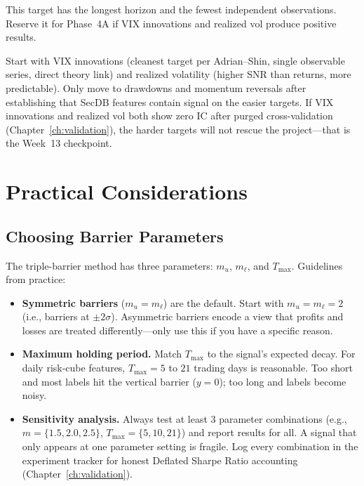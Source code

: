 This target has the longest horizon and the fewest independent
observations.
Reserve it for Phase~4A if VIX innovations and realized vol
produce positive results.

\begin{keyidea}
Start with VIX innovations (cleanest target per Adrian--Shin, single
observable series, direct theory link) and realized volatility
(higher SNR than returns, more predictable).
Only move to drawdowns and momentum reversals after establishing
that SecDB features contain signal on the easier targets.
If VIX innovations and realized vol both show zero IC after purged
cross-validation (Chapter~\ref{ch:validation}), the harder targets
will not rescue the project---that is the Week~13 checkpoint.
\end{keyidea}


\section{Practical Considerations}
\label{sec:labeling-practical}

\subsection{Choosing Barrier Parameters}

The triple-barrier method has three parameters: $m_u$, $m_\ell$, and $T_{\max}$.
Guidelines from practice:

\begin{itemize}[leftmargin=2em]
\item \textbf{Symmetric barriers} ($m_u = m_\ell$) are the default.
Start with $m_u = m_\ell = 2$ (i.e., barriers at $\pm 2\sigma$).
Asymmetric barriers encode a view that profits and losses are
treated differently---only use this if you have a specific reason.

\item \textbf{Maximum holding period.}
Match $T_{\max}$ to the signal's expected decay.
For daily risk-cube features, $T_{\max} = 5$ to $21$ trading days is
reasonable.
Too short and most labels hit the vertical barrier ($y=0$);
too long and labels become noisy.

\item \textbf{Sensitivity analysis.}
Always test at least 3 parameter combinations
(e.g., $m = \{1.5, 2.0, 2.5\}$, $T_{\max} = \{5, 10, 21\}$)
and report results for all.
A signal that only appears at one parameter setting is fragile.
Log every combination in the experiment tracker for honest Deflated
Sharpe Ratio accounting (Chapter~\ref{ch:validation}).
\end{itemize}

